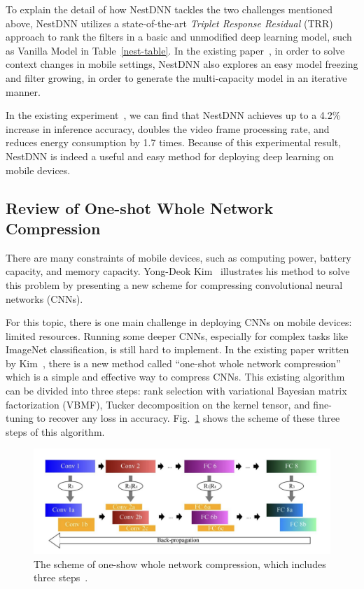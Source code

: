 \documentclass{article}
\begin{document}
To explain the detail of how NestDNN tackles the two challenges mentioned above, NestDNN utilizes a state-of-the-art \textit{Triplet Response Residual} (TRR) approach to rank the filters in a basic and unmodified deep learning model, such as Vanilla Model in Table~\ref{nest-table}. In the existing paper~\cite{fang2018nestdnn}, in order to solve context changes in mobile settings, NestDNN also explores an easy model freezing and filter growing, in order to generate the multi-capacity model in an iterative manner.	

In the existing experiment~\cite{fang2018nestdnn}, we can find that NestDNN achieves up to a 4.2\% increase in inference accuracy, doubles the video frame processing rate, and reduces energy consumption by 1.7 times. Because of this experimental result, NestDNN is indeed a useful and easy method for deploying deep learning on mobile devices.


\subsection{Review of One-shot Whole Network Compression}
There are many constraints of mobile devices, such as computing power, battery capacity, and memory capacity. Yong-Deok Kim~\cite{kim2016compression} illustrates his method to solve this problem by presenting a new scheme for compressing convolutional neural networks (CNNs).

For this topic, there is one main challenge in deploying CNNs on mobile devices: limited resources. Running some deeper CNNs, especially for complex tasks like ImageNet classification, is still hard to implement. In the existing paper written by Kim~\cite{kim2016compression}, there is a new method called “one-shot whole network compression” which is a simple and effective way to compress CNNs. This existing algorithm can be divided into three steps: rank selection with variational Bayesian matrix factorization (VBMF), Tucker decomposition on the kernel tensor, and fine-tuning to recover any loss in accuracy. Fig.~\ref{one-shot-steps} shows the scheme of these three steps of this algorithm.

\begin{figure}[!h]
	\centering
	\includegraphics[width=1\textwidth]{./figure/one-shot-steps.png}
	\caption{The scheme of one-show whole network compression, which includes three steps~\cite{kim2016compression}.}
	\label{one-shot-steps}
\end{figure}
\end{document}
